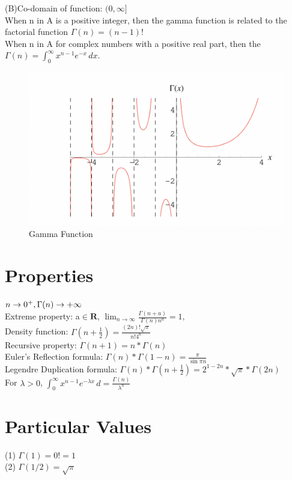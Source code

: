 \documentclass[12pt,a4paper]{report}
\begin{document}
(B)Co-domain of function: $(0, \infty]$\\
\indent\indent\indent When n in A is a positive integer, then the gamma function is related to the factorial function  $\Gamma(n) = (n-1)!$ \\
\indent\indent\indent When n in A for complex numbers with a positive real part, then the ${\displaystyle \Gamma (n)=\int _{0}^{\infty }x^{n-1}e^{-x}\,dx.}$

\begin{figure}[h]
    \centering
    \includegraphics[width=0.4\linewidth]{Images/gammafun.png}
    \caption{Gamma Function}
    \label{fig:Gamma function}
\end{figure}

\section{Properties}
\indent\indent [1.] ${\displaystyle} n\to 0^+, {\displaystyle} \Gamma(n)\to+\infty$ \\

\indent [2.] Extreme property: a$\in\mathbf{R}$, $\lim_{n\to\infty} \frac{\Gamma(n+a)}{\Gamma(n)n^{a}} = 1, $ \\

\indent [3.] Density function: ${\displaystyle \Gamma \left(n+{\tfrac {1}{2}}\right)={\frac {(2n)!{\sqrt {\pi }}}{n!4^{n}}}}$ \\

\indent [4.] Recursive property: $\Gamma(n + 1)=n*\Gamma(n)$\\

\indent [5.] Euler's Reflection formula: $\Gamma(n)*\Gamma(1-n)=\frac{\pi}{\sin\pi n}$\\

\indent [6.] Legendre Duplication formula: $\Gamma(n)*\Gamma(n+\frac{1}{2})=2^{1-2n}*\sqrt{\pi}*\Gamma(2n)$\\

\indent [7.] For ${\lambda} > 0$, $ {\int _{0}^{\infty }x^{n-1}e^{-\lambda x}\,d} = \displaystyle \frac{\Gamma (n)}{\lambda^n}$\\

\section{Particular Values}
\indent\indent (1) $\Gamma(1) = 0! = 1$\\
\indent (2) $\Gamma(1/2) = \sqrt{\pi}$ \
\end{document}

